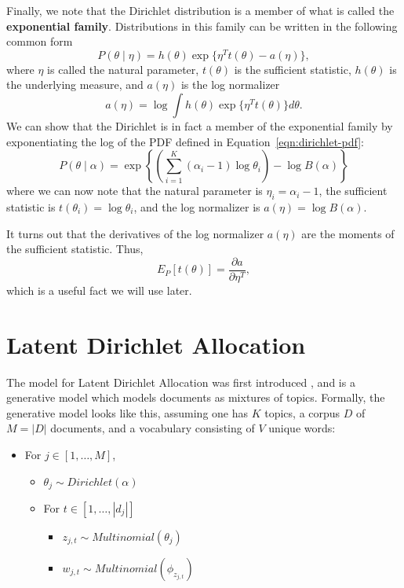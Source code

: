 \documentclass[11pt]{article}
\begin{document}
Finally, we note that the Dirichlet distribution is a member of what is
called the \textbf{exponential family}. Distributions in this family can be
written in the following common form
\begin{equation}
  P(\theta \mid \eta) = h(\theta) \exp\{\eta^T t(\theta) - a(\eta)\},
\end{equation}
where $\eta$ is called the natural parameter, $t(\theta)$ is the
sufficient statistic, $h(\theta)$ is the underlying measure, and $a(\eta)$
is the log normalizer
\begin{equation}
  a(\eta) = \log \int h(\theta) \exp\{\eta^T t(\theta)\} d\theta.
\end{equation}
We can show that the Dirichlet is in fact a member of the exponential
family by exponentiating the log of the PDF defined in
Equation~\ref{eqn:dirichlet-pdf}:
\begin{equation}
  P(\theta \mid \alpha) = \exp\left\{
    \left(\sum_{i=1}^K (\alpha_i - 1) \log \theta_i\right)
    - \log B(\alpha)
  \right\}
  \label{eqn:dirichlet-as-exponential-family}
\end{equation}
where we can now note that the natural parameter is $\eta_i = \alpha_i -
1$, the sufficient statistic is $t(\theta_i) = \log \theta_i$, and the log
normalizer is $a(\eta) = \log B(\alpha)$.

It turns out that the derivatives of the log normalizer $a(\eta)$ are the
moments of the sufficient statistic. Thus,
\begin{equation}
  E_P[t(\theta)] = \frac{\partial a}{\partial \eta^T},
  \label{eqn:expectation-sufficient-statistic}
\end{equation}
which is a useful fact we will use later.

\section{Latent Dirichlet Allocation}

The model for Latent Dirichlet Allocation was first introduced
\citet*{Blei:2003:LDA}, and is a generative model which models documents as
mixtures of topics. Formally, the generative model looks like this,
assuming one has $K$ topics, a corpus $D$ of $M=|D|$ documents, and a
vocabulary consisting of $V$ unique words:

\begin{itemize}
  \item For $j\in[1, \ldots, M]$,
    \begin{itemize}
      \item $\theta_j \sim Dirichlet(\alpha)$
      \item For $t \in [1,\ldots, |d_j|]$
        \begin{itemize}
          \item $z_{j,t} \sim Multinomial(\theta_j)$
          \item $w_{j,t} \sim Multinomial(\phi_{z_{j,t}})$
        \end{itemize}
    \end{itemize}
\end{itemize}
\end{document}
